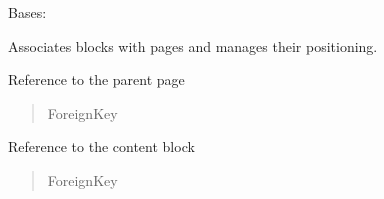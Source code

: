 \documentclass[letterpaper,10pt,english]{sphinxmanual}
\begin{document}
\begin{fulllineitems}
\label{\detokenize{pages_app.models:pages_app.models.page_block.PageBlock}}
\pysigstartsignatures
\pysiglinewithargsret
{}
{\sphinxparamcomma {}}
{}
\pysigstopsignatures
\sphinxAtStartPar
Bases: 

\sphinxAtStartPar
Associates blocks with pages and manages their positioning.

\begin{fulllineitems}
\label{\detokenize{pages_app.models:pages_app.models.page_block.PageBlock.page}}
\pysigstartsignatures
\pysigline
{}
\pysigstopsignatures
\sphinxAtStartPar
Reference to the parent page
\begin{quote}\begin{description}
\sphinxAtStartPar
ForeignKey

\end{description}\end{quote}

\end{fulllineitems}


\begin{fulllineitems}
\label{\detokenize{pages_app.models:pages_app.models.page_block.PageBlock.block}}
\pysigstartsignatures
\pysigline
{}
\pysigstopsignatures
\sphinxAtStartPar
Reference to the content block
\begin{quote}\begin{description}
\sphinxAtStartPar
ForeignKey

\end{description}\end{quote}

\end{fulllineitems}



\end{fulllineitems}
\end{document}
